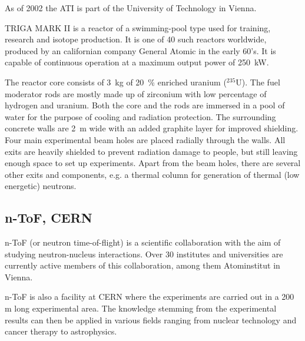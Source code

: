 \documentclass[twoside,12pt]{packages/mytustyle}  %
\let\origdescription\description
\renewenvironment{description}{
  \setlength{\leftmargini}{0em}
  \origdescription
  \setlength{\itemindent}{0em}
  \setlength{\labelsep}{\textwidth}
}
{\endlist}
\begin{document}
As of 2002 the ATI is part of the University of Technology in Vienna.


\begin{description}
\item[TRIGA MARK II neutron reactor]
TRIGA MARK II is a reactor of a swimming-pool type used for training, research and isotope production. It is one of 40 such reactors worldwide, produced by an californian company General Atomic in the early 60's. It is capable of continuous operation at a maximum output power of 250~kW. 

The reactor core consists of 3~kg of 20~\% enriched uranium ($^{235}$U). The fuel moderator rods are mostly made up of zirconium with low percentage of hydrogen and uranium. Both the core and the rods are immersed in a pool of water for the purpose of cooling and radiation protection. The surrounding concrete walls are 2~m wide with an added graphite layer for improved shielding. Four main experimental beam holes are placed radially through the walls. All exits are heavily shielded to prevent radiation damage to people, but still leaving enough space to set up experiments. Apart from the beam holes, there are several other exits and components, e.g. a thermal column for generation of thermal (low energetic) neutrons.

\end{description}




\subsection{n-ToF, CERN}
n-ToF (or neutron time-of-flight) is a scientific collaboration with the aim of studying neutron-nucleus interactions. Over 30 institutes and universities are currently active members of this collaboration, among them Atominstitut in Vienna.

n-ToF is also a facility at CERN where the experiments are carried out in a 200 m long experimental area. The knowledge stemming from the experimental results can then be applied in various fields ranging from nuclear technology and cancer therapy to astrophysics.
\end{document}
